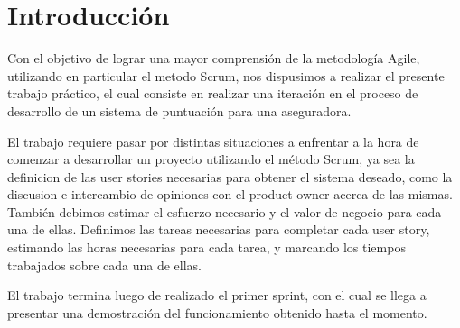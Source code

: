 \section{Introducción}

Con el objetivo de lograr una mayor comprensión de la metodología Agile, utilizando en particular el metodo Scrum, nos dispusimos a realizar el presente trabajo práctico, el cual consiste en realizar una iteración en el proceso de desarrollo de un sistema de puntuación para una aseguradora.

El trabajo requiere pasar por distintas situaciones a enfrentar a la hora de comenzar a desarrollar un proyecto utilizando el método Scrum, ya sea la definicion de las user stories necesarias para obtener el sistema deseado, como la discusion e intercambio de opiniones con el product owner acerca de las mismas. También debimos estimar el esfuerzo necesario y el valor de negocio para cada una de ellas. Definimos las tareas necesarias para completar cada user story, estimando las horas necesarias para cada tarea, y marcando los tiempos trabajados sobre cada una de ellas.

El trabajo termina luego de realizado el primer sprint, con el cual se llega a presentar una demostración del funcionamiento obtenido hasta el momento.